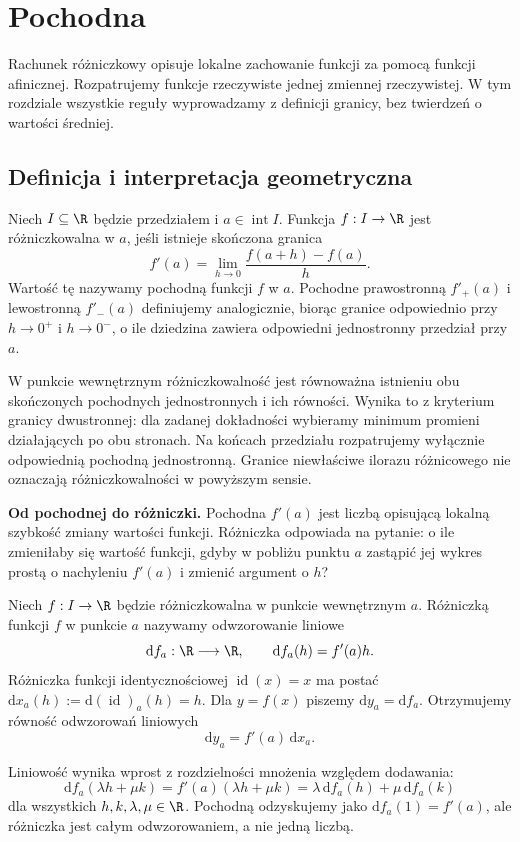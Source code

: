 \chapter{Pochodna}
\label{ma1:ch:derivative}

Rachunek różniczkowy opisuje lokalne zachowanie funkcji za pomocą funkcji afinicznej. Rozpatrujemy funkcje rzeczywiste jednej zmiennej rzeczywistej. W tym rozdziale wszystkie reguły wyprowadzamy z definicji granicy, bez twierdzeń o wartości średniej.

\section{Definicja i interpretacja geometryczna}
\begin{definicja}
\label{ma1:def:derivative}
Niech $I\subseteq\R$ będzie przedziałem i $a\in\operatorname{int}I$. Funkcja $f:I\to\R$ jest różniczkowalna w $a$, jeśli istnieje skończona granica
\[
 f'(a)=\lim_{h\to0}\frac{f(a+h)-f(a)}h.
\]
Wartość tę nazywamy pochodną funkcji $f$ w $a$. Pochodne prawostronną $f'_+(a)$ i lewostronną $f'_-(a)$ definiujemy analogicznie, biorąc granice odpowiednio przy $h\to0^+$ i $h\to0^-$, o ile dziedzina zawiera odpowiedni jednostronny przedział przy $a$.
\end{definicja}
W punkcie wewnętrznym różniczkowalność jest równoważna istnieniu obu skończonych pochodnych jednostronnych i ich równości. Wynika to z kryterium granicy dwustronnej: dla zadanej dokładności wybieramy minimum promieni działających po obu stronach. Na końcach przedziału rozpatrujemy wyłącznie odpowiednią pochodną jednostronną. Granice niewłaściwe ilorazu różnicowego nie oznaczają różniczkowalności w powyższym sensie.

\medskip
\noindent\textbf{Od pochodnej do różniczki.}
Pochodna $f'(a)$ jest liczbą opisującą lokalną szybkość zmiany wartości funkcji. Różniczka odpowiada na pytanie: o ile zmieniłaby się wartość funkcji, gdyby w pobliżu punktu $a$ zastąpić jej wykres prostą o nachyleniu $f'(a)$ i zmienić argument o $h$?

\begin{definicja}[Różniczka]
\label{ma1:def:differential}
Niech $f:I\to\R$ będzie różniczkowalna w punkcie wewnętrznym $a$. Różniczką funkcji $f$ w punkcie $a$ nazywamy odwzorowanie liniowe
\[
 \mathrm{d}f_a:\R\longrightarrow\R,\qquad
 \mathrm{d}f_a(h)=f'(a)h.
\]
Różniczka funkcji identycznościowej $\operatorname{id}(x)=x$ ma postać $\mathrm{d}x_a(h):=\mathrm{d}(\operatorname{id})_a(h)=h$. Dla $y=f(x)$ piszemy $\mathrm{d}y_a=\mathrm{d}f_a$. Otrzymujemy równość odwzorowań liniowych
\[
 \mathrm{d}y_a=f'(a)\,\mathrm{d}x_a.
\]
\end{definicja}
Liniowość wynika wprost z rozdzielności mnożenia względem dodawania:
\[
 \mathrm{d}f_a(\lambda h+\mu k)
 =f'(a)(\lambda h+\mu k)
 =\lambda\,\mathrm{d}f_a(h)+\mu\,\mathrm{d}f_a(k)
\]
dla wszystkich $h,k,\lambda,\mu\in\R$. Pochodną odzyskujemy jako $\mathrm{d}f_a(1)=f'(a)$, ale różniczka jest całym odwzorowaniem, a nie jedną liczbą.

